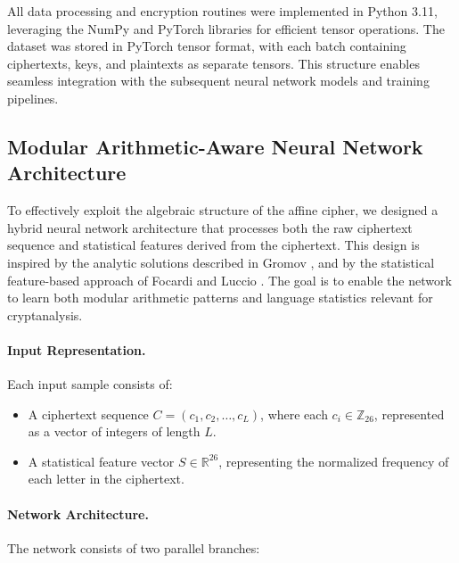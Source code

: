 \documentclass[manuscript,screen,acmtog,natbib=false]{acmart}
\begin{document}
  All data processing and encryption routines were implemented in Python 3.11, leveraging the NumPy and PyTorch libraries for efficient 
  tensor operations. The dataset was stored in PyTorch tensor format, with each batch containing ciphertexts, keys, and plaintexts as separate tensors. 
  This structure enables seamless integration with the subsequent neural network models and training pipelines.

  \subsection{Modular Arithmetic-Aware Neural Network Architecture}

    To effectively exploit the algebraic structure of the affine cipher, we designed a hybrid neural network 
    architecture that processes both the raw ciphertext sequence and statistical features derived from the
    ciphertext. This design is inspired by the analytic solutions described in Gromov \cite{gromov2023}, and
    by the statistical feature-based approach of Focardi and Luccio \cite{Focardi2018NeuralCO}. The goal is to
    enable the network to learn both modular arithmetic patterns and language statistics relevant for cryptanalysis.

    \paragraph{Input Representation.}
    Each input sample consists of:
    \begin{itemize}
        \item A ciphertext sequence $C = (c_1, c_2, \ldots, c_L)$, where each $c_i \in \mathbb{Z}_{26}$, represented as a vector of integers of length $L$.
        \item A statistical feature vector $S \in \mathbb{R}^{26}$, representing the normalized frequency of each letter in the ciphertext.
    \end{itemize}

    \paragraph{Network Architecture.}
    The network consists of two parallel branches:
\end{document}
